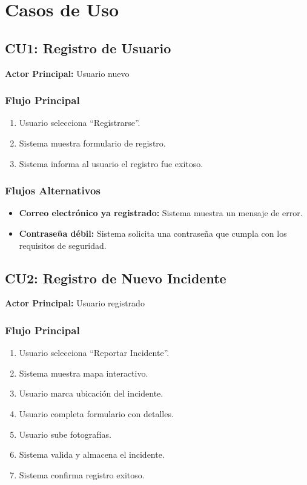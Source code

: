 

\section{Casos de Uso}

\subsection{CU1: Registro de Usuario}
\textbf{Actor Principal:} Usuario nuevo

\subsubsection*{Flujo Principal}
\begin{enumerate}
    \item Usuario selecciona ``Registrarse''.
    \item Sistema muestra formulario de registro.
    \item Sistema informa al usuario el registro fue exitoso.
\end{enumerate}

\subsubsection*{Flujos Alternativos}
\begin{itemize}
    \item \textbf{Correo electrónico ya registrado:} Sistema muestra un mensaje de error.
    \item \textbf{Contraseña débil:} Sistema solicita una contraseña que cumpla con los requisitos de seguridad.
\end{itemize}

\subsection{CU2: Registro de Nuevo Incidente}
\textbf{Actor Principal:} Usuario registrado

\subsubsection*{Flujo Principal}
\begin{enumerate}
    \item Usuario selecciona ``Reportar Incidente''.
    \item Sistema muestra mapa interactivo.
    \item Usuario marca ubicación del incidente.
    \item Usuario completa formulario con detalles.
    \item Usuario sube fotografías.
    \item Sistema valida y almacena el incidente.
    \item Sistema confirma registro exitoso.
\end{enumerate}

